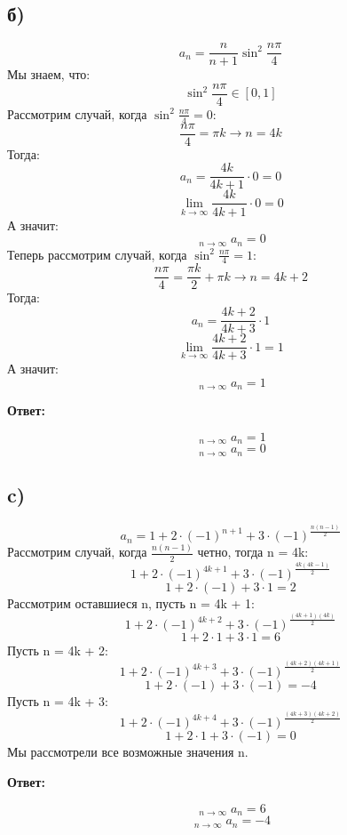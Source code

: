 \documentclass[a4paper,12pt]{article}
\DeclareMathOperator*\lowlim{\underline{lim}}
\DeclareMathOperator*\uplim{\overline{lim}}
\begin{document}
\subsection*{б) }
\[
a_n = \frac{n}{n+1} \sin^2{\frac{n\pi}{4}}
\]
Мы знаем, что:
\[
\sin^2{\frac{n\pi}{4}} \in [0, 1]
\]
Рассмотрим случай, когда $\sin^2{\frac{n\pi}{4}}  = 0$:
\[
\frac{n\pi}{4} = \pi k \rightarrow n = 4k
\]
Тогда:
\[
a_n = \frac{4k}{4k+1} \cdot 0  = 0 
\]
\[
\lim_{k \rightarrow \infty} \frac{4k}{4k+1} \cdot 0  = 0
\]
А значит:
\[
\lowlim_{n \rightarrow \infty} a_n = 0
\]
Теперь рассмотрим случай, когда $\sin^2{\frac{n\pi}{4}}  = 1$:
\[
\frac{n\pi}{4} = \frac{\pi k}{2} + \pi k \rightarrow n = 4k + 2
\]
Тогда:
\[
a_n = \frac{4k+2}{4k+3} \cdot 1 
\]
\[
\lim_{k \rightarrow \infty} \frac{4k+2}{4k+3} \cdot 1  = 1
\]
А значит:
\[
\uplim_{n \rightarrow \infty} a_n = 1
\]
\begin{center}
\textbf{Ответ:}
\end{center}
\[
\uplim_{n \rightarrow \infty} a_n = 1
\]
\[
\lowlim_{n \rightarrow \infty} a_n = 0
\]
\subsection*{c) }
\[
a_n = 1 + 2 \cdot (-1)^{n+1} + 3 \cdot (-1)^{\frac{n(n-1)}{2}}
\]
Рассмотрим случай, когда
$\frac{n(n-1)}{2}$ четно, тогда n = 4k:
\[
1 + 2 \cdot (-1)^{4k+1} + 3 \cdot (-1)^{\frac{4k(4k-1)}{2}}
\]
\[
1 + 2 \cdot (-1) + 3 \cdot 1 = 2 
\]
Рассмотрим оставшиеся n, пусть n = 4k + 1:
\[
1 + 2 \cdot (-1)^{4k+2} + 3 \cdot (-1)^{\frac{(4k+1)(4k)}{2}}
\]
\[
1 + 2 \cdot 1 + 3 \cdot 1 = 6
\]
Пусть n = 4k + 2:
\[
1 + 2 \cdot (-1)^{4k+3} + 3 \cdot (-1)^{\frac{(4k+2)(4k+1)}{2}}
\]
\[
1 + 2 \cdot (-1) + 3 \cdot (-1) = -4 
\]
Пусть n = 4k + 3:
\[
1 + 2 \cdot (-1)^{4k+4} + 3 \cdot (-1)^{\frac{(4k+3)(4k+2)}{2}}
\]
\[
1 + 2 \cdot 1 + 3 \cdot (-1) = 0
\]
Мы рассмотрели все возможные значения n.
\begin{center}
\textbf{Ответ:}
\end{center}
\[
\uplim_{n \rightarrow \infty} a_n = 6
\]
\[
\lowlim_{n \rightarrow \infty} a_n = -4
\]
\end{document}
